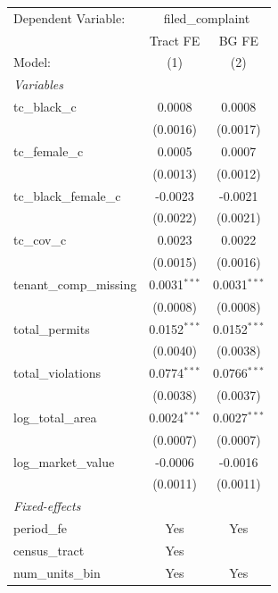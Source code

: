 \begin{tabular}{lcc}
   \tabularnewline \midrule \midrule
   Dependent Variable: & \multicolumn{2}{c}{filed\_complaint}\\
                           & Tract FE       & BG FE \\   
   Model:                  & (1)            & (2)\\  
   \midrule
   \emph{Variables}\\
   tc\_black\_c            & 0.0008         & 0.0008\\   
                           & (0.0016)       & (0.0017)\\   
   tc\_female\_c           & 0.0005         & 0.0007\\   
                           & (0.0013)       & (0.0012)\\   
   tc\_black\_female\_c    & -0.0023        & -0.0021\\   
                           & (0.0022)       & (0.0021)\\   
   tc\_cov\_c              & 0.0023         & 0.0022\\   
                           & (0.0015)       & (0.0016)\\   
   tenant\_comp\_missing   & 0.0031$^{***}$ & 0.0031$^{***}$\\   
                           & (0.0008)       & (0.0008)\\   
   total\_permits          & 0.0152$^{***}$ & 0.0152$^{***}$\\   
                           & (0.0040)       & (0.0038)\\   
   total\_violations       & 0.0774$^{***}$ & 0.0766$^{***}$\\   
                           & (0.0038)       & (0.0037)\\   
   log\_total\_area        & 0.0024$^{***}$ & 0.0027$^{***}$\\   
                           & (0.0007)       & (0.0007)\\   
   log\_market\_value      & -0.0006        & -0.0016\\   
                           & (0.0011)       & (0.0011)\\   
   \midrule
   \emph{Fixed-effects}\\
   period\_fe              & Yes            & Yes\\  
   census\_tract           & Yes            & \\  
   num\_units\_bin         & Yes            & Yes\\  

\end{tabular}
